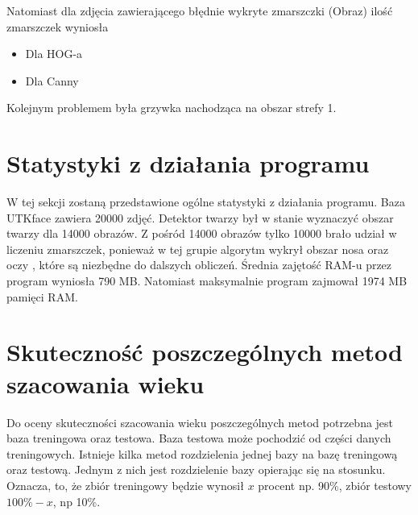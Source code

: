 \documentclass[a4paper,twoside,12pt]{book}
\begin{document}
    Natomiast dla zdjęcia zawierającego błędnie wykryte zmarszczki (Obraz) ilość zmarszczek wyniosła
    \begin{itemize}
        \item Dla HOG-a %
        \item Dla Canny
    \end{itemize}

    Kolejnym problemem była grzywka nachodząca na obszar strefy 1.  %


    \section{Statystyki z działania programu}\label{sec:statystyki-z-działania-programu}
    W tej sekcji zostaną przedstawione ogólne statystyki z działania programu.
    Baza UTKface zawiera 20000 zdjęć. Detektor twarzy był w stanie wyznaczyć obszar twarzy dla 14000 obrazów.
    Z pośród 14000 obrazów tylko 10000 brało udział w liczeniu zmarszczek, ponieważ w tej grupie algorytm wykrył
    obszar nosa oraz oczy
    , które są niezbędne do dalszych obliczeń.
    Średnia zajętość RAM-u przez program wyniosła 790 MB.
    Natomiast maksymalnie program zajmował 1974 MB pamięci RAM.



    \section{Skuteczność poszczególnych metod szacowania wieku}\label{sec:skuteczność-poszczególnych-metod-szacowania-wieku}
    Do oceny skuteczności szacowania wieku poszczególnych metod potrzebna jest baza treningowa oraz testowa.
    Baza testowa może pochodzić od części danych treningowych. Istnieje kilka metod rozdzielenia jednej bazy na bazę
    treningową oraz testową.
    Jednym z nich jest rozdzielenie bazy opierając się na stosunku. Oznacza, to, że zbiór treningowy będzie wynosił
    $x$ procent np. 90\%, zbiór testowy $100\% -x$, np 10\%.
\end{document}
